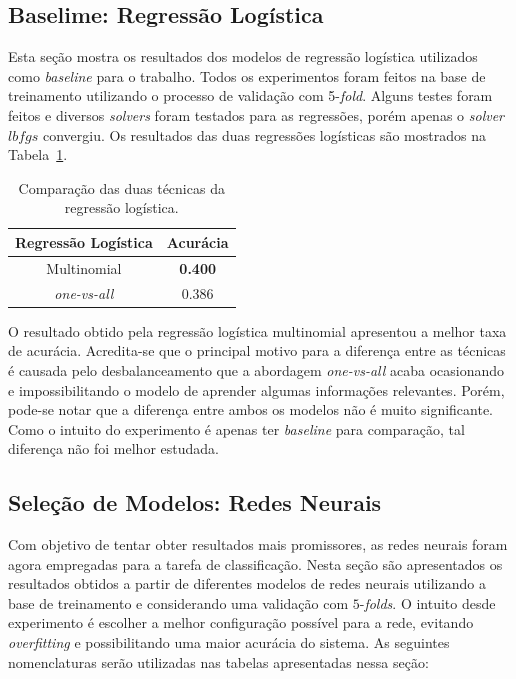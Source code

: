 \documentclass[conference]{IEEEtran}
\begin{document}
\subsection{Baselime: Regressão Logística}

Esta seção mostra os resultados dos modelos de regressão logística utilizados como \emph{baseline} para o trabalho. Todos os experimentos foram feitos na base de treinamento utilizando o processo de validação com 5-\emph{fold}. Alguns testes foram feitos e diversos \emph{solvers} foram testados para as regressões, porém apenas o \emph{solver} $lbfgs$ convergiu. Os resultados das duas regressões logísticas são mostrados na Tabela~\ref{tab:reg}.

\begin{table}[h!]
	\centering
	
	\begin{tabular}{cc} \toprule
		\textbf{Regressão Logística} & \textbf{Acurácia} \\ \toprule 	
		Multinomial		          & \textbf{0.400}    \\
		\emph{one-vs-all}         & 0.386             \\ \bottomrule
	\end{tabular}
	\caption{Comparação das duas técnicas da regressão logística.}
 	\label{tab:reg}
\end{table}

O resultado obtido pela regressão logística multinomial apresentou a melhor taxa de acurácia. Acredita-se que o principal motivo para a diferença entre as técnicas é causada pelo desbalanceamento que a abordagem \emph{one-vs-all} acaba ocasionando e impossibilitando o modelo de aprender algumas informações relevantes. Porém, pode-se notar que a diferença entre ambos os modelos não é muito significante. Como o intuito do experimento é apenas ter \emph{baseline} para comparação, tal diferença não foi melhor estudada.


\subsection{Seleção de Modelos: Redes Neurais}

Com objetivo de tentar obter resultados mais promissores, as redes neurais foram agora empregadas para a tarefa de classificação. Nesta seção são apresentados os resultados obtidos a partir de diferentes modelos de redes neurais utilizando a base de treinamento e considerando uma validação com $5$-\emph{folds}. O intuito desde experimento é escolher a melhor configuração possível para a rede, evitando \emph{overfitting} e possibilitando uma maior acurácia do sistema. As seguintes nomenclaturas serão utilizadas nas tabelas apresentadas nessa seção:
\end{document}
